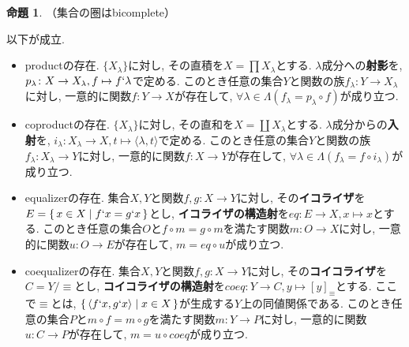 \documentclass[a4paper, twoside]{bxjsarticle}
\theoremstyle{definition}
\newtheorem{prop}[thm]{命題}
\begin{document}
        \begin{prop}
            （集合の圏はbicomplete）
            
            以下が成立.
            \begin{itemize}
                \item productの存在. $\{X_\lambda\}$に対し, その直積を$X = \prod X_\lambda$とする. $\lambda$成分への\textbf{射影}を, $p_\lambda\colon X\to X_\lambda, f \mapsto f`\lambda$で定める. このとき任意の集合$Y$と関数の族$f_\lambda\colon Y\to X_\lambda$に対し, 一意的に関数$f\colon Y\to X$が存在して, $\forall \lambda \in \Lambda (f_\lambda = p_\lambda \circ f)$が成り立つ.
                \item coproductの存在. $\{X_\lambda\}$に対し, その直和を$X = \coprod X_\lambda$とする. $\lambda$成分からの\textbf{入射}を, $i_\lambda\colon X_\lambda\to X, t \mapsto \langle \lambda, t \rangle$で定める. このとき任意の集合$Y$と関数の族$f_\lambda\colon X_\lambda\to Y$に対し, 一意的に関数$f\colon X\to Y$が存在して, $\forall \lambda \in \Lambda (f_\lambda = f \circ i_\lambda)$が成り立つ.
                \item equalizerの存在. 集合$X, Y$と関数$f, g\colon X\to Y$に対し, その\textbf{イコライザ}を$E=\set{x\in X|f`x = g`x}$とし, \textbf{イコライザの構造射}を$eq\colon E\to X, x \mapsto x$とする. このとき任意の集合$O$と$f\circ m = g\circ m$を満たす関数$m\colon O\to X$に対し, 一意的に関数$u\colon O\to E$が存在して, $m = eq \circ u$が成り立つ. 
                \item coequalizerの存在. 集合$X, Y$と関数$f, g\colon X\to Y$に対し, その\textbf{コイコライザ}を$C=Y/\equiv$とし, \textbf{コイコライザの構造射}を$coeq\colon Y\to C, y \mapsto [y]_\equiv$とする. ここで$\equiv$とは, $\set{\langle f`x, g`x \rangle|x\in X}$が生成する$Y$上の同値関係である. このとき任意の集合$P$と$m\circ f = m\circ g$を満たす関数$m\colon Y\to P$に対し, 一意的に関数$u\colon C\to P$が存在して, $m = u \circ coeq$が成り立つ. 
            \end{itemize}
        \end{prop}
\end{document}
